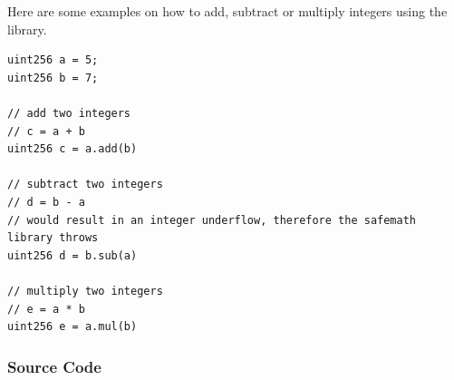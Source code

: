 Here are some examples on how to add, subtract or multiply integers using the library.
\\
\begin{lstlisting}[language=Solidity, caption={Examples for SafeMath calculations}, label={lis:safemath_example}]
uint256 a = 5;
uint256 b = 7;

// add two integers
// c = a + b
uint256 c = a.add(b)

// subtract two integers
// d = b - a
// would result in an integer underflow, therefore the safemath library throws
uint256 d = b.sub(a)

// multiply two integers
// e = a * b
uint256 e = a.mul(b)
\end{lstlisting}
\subsubsection{Source Code}


\lstset{numbers=left,numberblanklines=true,escapeinside=||}

\let\origthelstnumber\thelstnumber
\makeatletter
\newcommand*\Suppressnumber{%
  \lst@AddToHook{OnNewLine}{%
    \let\thelstnumber\relax%
     \advance\c@lstnumber-\@ne\relax%
    }%
}

\newcommand*\Reactivatenumber[1]{%
  \setcounter{lstnumber}{\numexpr#1-1\relax}
  \lst@AddToHook{OnNewLine}{%
   \let\thelstnumber\origthelstnumber%
   \refstepcounter{lstnumber}
  }%
}

